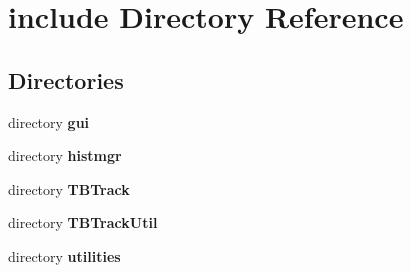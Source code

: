 \section{include Directory Reference}
\label{dir_d4ff781af9969516a764ce843cb2b09b}
\subsection*{Directories}
\begin{DoxyCompactItemize}
\item 
directory {\bf gui}
\item 
directory {\bf histmgr}
\item 
directory {\bf T\-B\-Track}
\item 
directory {\bf T\-B\-Track\-Util}
\item 
directory {\bf utilities}
\end{DoxyCompactItemize}
